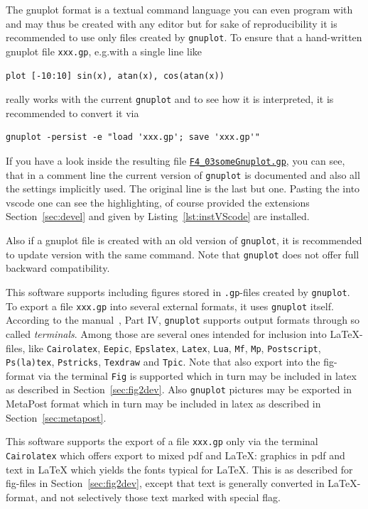 The gnuplot format is a textual command language you can even program with 
and may thus be created with any editor but
for sake of reproducibility it is recommended to use only files
created by \texttt{gnuplot}.
To ensure that a hand-written gnuplot file \texttt{xxx.gp},
e.g.\@ with a single line like
%
\begin{verbatim}
plot [-10:10] sin(x), atan(x), cos(atan(x))
\end{verbatim}
%
really works
with the current \texttt{gnuplot} and to see how it is interpreted,
it is recommended to convert it via
%
\begin{lstlisting}
gnuplot -persist -e "load 'xxx.gp'; save 'xxx.gp'"
\end{lstlisting}
%
If you have a look inside the resulting file 
\href{\urlSite fromTex/F4_03someGnuplot.gp}{\texttt{F4\_03someGnuplot.gp}}, 
you can see, that in a comment line
the current version of \texttt{gnuplot} is documented
and also all the settings implicitly used.
The original line is the last but one. 
Pasting the into vscode one can see the highlighting, 
of course provided the extensions Section~\ref{sec:devel} 
and given by Listing~\ref{lst:instVScode} are installed. 

Also if a gnuplot file is created with an old version of \texttt{gnuplot},
it is recommended to update version with the same command.
Note that \texttt{gnuplot} does not offer full backward compatibility. 


This software supports including 
figures stored in \texttt{.gp}-files created by \texttt{gnuplot}.
To export a file \texttt{xxx.gp} into several external formats, 
it uses \texttt{gnuplot} itself. 
According to the manual~\cite{GnuPlot}, Part IV, 
\texttt{gnuplot} supports output formats through so called \emph{terminals}. 
Among those are several ones intended for inclusion into \LaTeX-files, 
like \texttt{Cairolatex}, \texttt{Eepic}, \texttt{Epslatex}, 
\texttt{Latex}, \texttt{Lua}, 
\texttt{Mf}, \texttt{Mp}, \texttt{Postscript}, \texttt{Ps(la)tex}, %
\texttt{Pstricks}, \texttt{Texdraw} and \texttt{Tpic}. 
Note that also export into the fig-format via the terminal \texttt{Fig} 
is supported which in turn may be included in latex 
as described in Section~\ref{sec:fig2dev}. 
Also \texttt{gnuplot} pictures may be exported in MetaPost format 
which in turn may be included in latex 
as described in Section~\ref{sec:metapost}. 

This software supports the export of a file \texttt{xxx.gp} 
only via the terminal \texttt{Cairolatex} 
which offers export to mixed pdf and \LaTeX\@: 
graphics in pdf and text in \LaTeX{}
which yields the fonts typical for \LaTeX. 
This is as described for fig-files in Section~\ref{sec:fig2dev}, 
except that text is generally converted in \LaTeX{}-format, 
and not selectively those text marked with special flag. 

